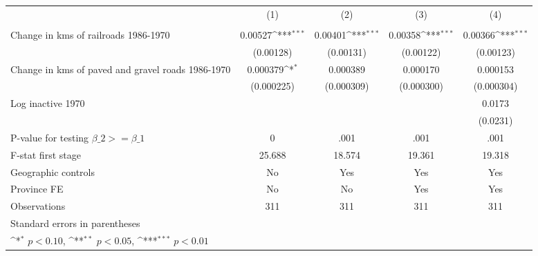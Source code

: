 {
\def\sym#1{\ifmmode^{#1}\else\(^{#1}\)\fi}
\begin{tabular}{l*{4}{c}}
\hline\hline
                &\multicolumn{1}{c}{(1)}&\multicolumn{1}{c}{(2)}&\multicolumn{1}{c}{(3)}&\multicolumn{1}{c}{(4)}\\
                &\multicolumn{1}{c}{}&\multicolumn{1}{c}{}&\multicolumn{1}{c}{}&\multicolumn{1}{c}{}\\
\hline
Change in kms of railroads 1986-1970&  0.00527\sym{***}&  0.00401\sym{***}&  0.00358\sym{***}&  0.00366\sym{***}\\
                &(0.00128)         &(0.00131)         &(0.00122)         &(0.00123)         \\
[1em]
Change in kms of paved and gravel roads 1986-1970& 0.000379\sym{*}  & 0.000389         & 0.000170         & 0.000153         \\
                &(0.000225)         &(0.000309)         &(0.000300)         &(0.000304)         \\
[1em]
Log inactive 1970&                  &                  &                  &   0.0173         \\
                &                  &                  &                  & (0.0231)         \\
\hline
P-value for testing $\beta\_{2} >= \beta\_{1}$&        0         &     .001         &     .001         &     .001         \\
F-stat first stage&   25.688         &   18.574         &   19.361         &   19.318         \\
Geographic controls&       No         &      Yes         &      Yes         &      Yes         \\
Province FE     &       No         &       No         &      Yes         &      Yes         \\
Observations    &      311         &      311         &      311         &      311         \\
\hline\hline
\multicolumn{5}{l}{\footnotesize Standard errors in parentheses}\\
\multicolumn{5}{l}{\footnotesize \sym{*} \(p<0.10\), \sym{**} \(p<0.05\), \sym{***} \(p<0.01\)}\\
\end{tabular}
}
